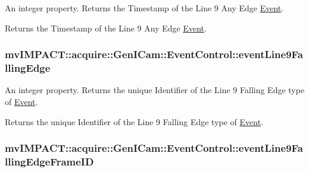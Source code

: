 An integer property. Returns the Timestamp of the Line 9 Any Edge \hyperlink{classmv_i_m_p_a_c_t_1_1acquire_1_1_event}{Event}. 

Returns the Timestamp of the Line 9 Any Edge \hyperlink{classmv_i_m_p_a_c_t_1_1acquire_1_1_event}{Event}. \hypertarget{classmv_i_m_p_a_c_t_1_1acquire_1_1_gen_i_cam_1_1_event_control_af2176f2a5d6d6a1075a0f51ea8343860}{
\subsubsection[{event\+Line9\+Falling\+Edge}]{ mv\+I\+M\+P\+A\+C\+T\+::acquire\+::\+Gen\+I\+Cam\+::\+Event\+Control\+::event\+Line9\+Falling\+Edge}}\label{classmv_i_m_p_a_c_t_1_1acquire_1_1_gen_i_cam_1_1_event_control_af2176f2a5d6d6a1075a0f51ea8343860}


An integer property. Returns the unique Identifier of the Line 9 Falling Edge type of \hyperlink{classmv_i_m_p_a_c_t_1_1acquire_1_1_event}{Event}. 

Returns the unique Identifier of the Line 9 Falling Edge type of \hyperlink{classmv_i_m_p_a_c_t_1_1acquire_1_1_event}{Event}. \hypertarget{classmv_i_m_p_a_c_t_1_1acquire_1_1_gen_i_cam_1_1_event_control_a5ec264c966aa05f950082850e0b5107a}{
\subsubsection[{event\+Line9\+Falling\+Edge\+Frame\+I\+D}]{ mv\+I\+M\+P\+A\+C\+T\+::acquire\+::\+Gen\+I\+Cam\+::\+Event\+Control\+::event\+Line9\+Falling\+Edge\+Frame\+I\+D}}\label{classmv_i_m_p_a_c_t_1_1acquire_1_1_gen_i_cam_1_1_event_control_a5ec264c966aa05f950082850e0b5107a}


